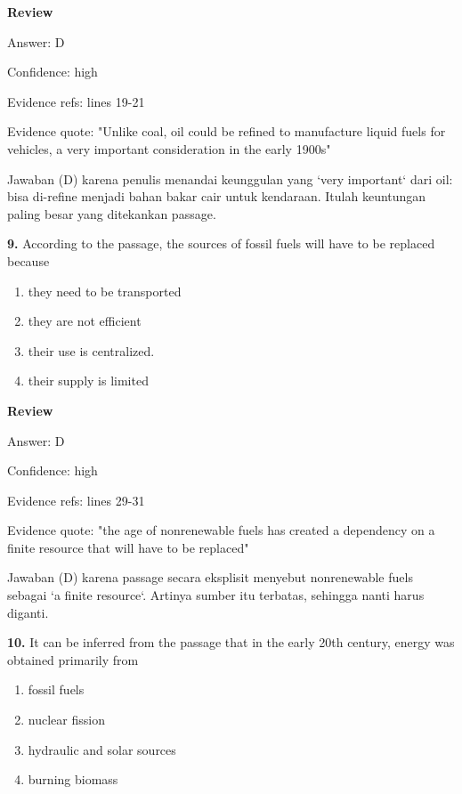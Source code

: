 \documentclass[12pt]{article}
\begin{document}
\par
\begingroup
\setlength{\parskip}{0pt}
\setlength{\parindent}{0pt}
\textbf{Review}\par
Answer: D\par
Confidence: high\par
Evidence refs: lines 19-21\par
Evidence quote: "Unlike coal, oil could be refined to manufacture liquid fuels for vehicles, a very important consideration in the early 1900s"\par
Jawaban (D) karena penulis menandai keunggulan yang `very important` dari oil: bisa di-refine menjadi bahan bakar cair untuk kendaraan. Itulah keuntungan paling besar yang ditekankan passage.\par
\endgroup
\par
\vspace{0.25\baselineskip}
\noindent\textbf{9.} According to the passage, the sources of fossil fuels will have to be replaced because
\begin{enumerate}[label=(\Alph*),leftmargin=*,itemsep=0.2em]
\item they need to be transported
\item they are not efficient
\item their use is centralized.
\item their supply is limited
\end{enumerate}
\par
\begingroup
\setlength{\parskip}{0pt}
\setlength{\parindent}{0pt}
\textbf{Review}\par
Answer: D\par
Confidence: high\par
Evidence refs: lines 29-31\par
Evidence quote: "the age of nonrenewable fuels has created a dependency on a finite resource that will have to be replaced"\par
Jawaban (D) karena passage secara eksplisit menyebut nonrenewable fuels sebagai `a finite resource`. Artinya sumber itu terbatas, sehingga nanti harus diganti.\par
\endgroup
\par
\vspace{0.25\baselineskip}
\noindent\textbf{10.} It can be inferred from the passage that in the early 20th century, energy was obtained primarily from
\begin{enumerate}[label=(\Alph*),leftmargin=*,itemsep=0.2em]
\item fossil fuels
\item nuclear fission
\item hydraulic and solar sources
\item burning biomass
\end{enumerate}
\end{document}
